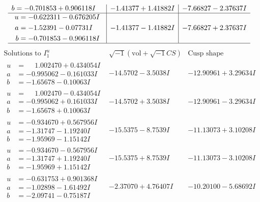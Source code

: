 \documentclass[1p]{elsarticle_modified}
\theoremstyle{definition}
\newcommand{\I}{\sqrt{-1}}
\begin{document}
$$\begin{array}{c|c|c}
\begin{aligned}
b &= -0.701853 + 0.906118 I\end{aligned}
 & -1.41377 + 1.41882 I & -7.66827 - 2.37637 I \\ \hline\begin{aligned}
u &= -0.622311 - 0.676205 I \\
a &= -1.52391 - 0.07731 I \\
b &= -0.701853 - 0.906118 I\end{aligned}
 & -1.41377 - 1.41882 I & -7.66827 + 2.37637 I\\
 \hline 
 \end{array}$$\newpage$$\begin{array}{c|c|c}  
\text{Solutions to }I^u_{1}& \I (\text{vol} + \sqrt{-1}CS) & \text{Cusp shape}\\
 \hline 
\begin{aligned}
u &= \phantom{-}1.002470 + 0.434054 I \\
a &= -0.995062 - 0.161033 I \\
b &= -1.65678 - 0.10063 I\end{aligned}
 & -14.5702 - 3.5038 I & -12.90961 + 3.29634 I \\ \hline\begin{aligned}
u &= \phantom{-}1.002470 - 0.434054 I \\
a &= -0.995062 + 0.161033 I \\
b &= -1.65678 + 0.10063 I\end{aligned}
 & -14.5702 + 3.5038 I & -12.90961 - 3.29634 I \\ \hline\begin{aligned}
u &= -0.934670 + 0.567956 I \\
a &= -1.31747 - 1.19240 I \\
b &= -1.95969 - 1.15142 I\end{aligned}
 & -15.5375 - 8.7539 I & -11.13073 + 3.10208 I \\ \hline\begin{aligned}
u &= -0.934670 - 0.567956 I \\
a &= -1.31747 + 1.19240 I \\
b &= -1.95969 + 1.15142 I\end{aligned}
 & -15.5375 + 8.7539 I & -11.13073 - 3.10208 I \\ \hline\begin{aligned}
u &= -0.631753 + 0.901368 I \\
a &= -1.02898 - 1.61492 I \\
b &= -2.09741 - 0.75187 I\end{aligned}
 & -2.37070 + 4.76407 I & -10.20100 - 5.68692 I \\ \hline\begin{aligned}

\end{aligned}
\end{array}$$
\end{document}
